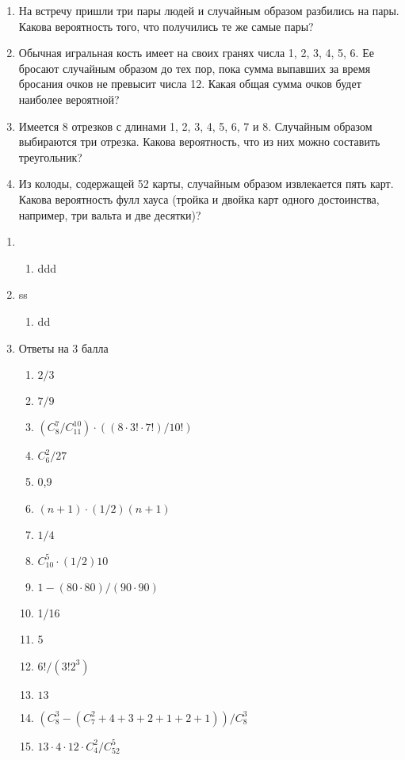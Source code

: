 \documentclass[12pt]{article} %
\begin{document}
\begin{enumerate}
\begin{enumerate}
  \item На встречу пришли три пары людей и случайным образом разбились на пары. Какова вероятность того, что получились те же самые пары?
  \newpage
\item Обычная игральная кость имеет на своих гранях числа 1, 2, 3, 4, 5, 6. Ее бросают случайным образом до тех пор, пока сумма выпавших за время бросания очков не превысит числа 12. Какая общая сумма очков будет наиболее вероятной?

	\item Имеется 8 отрезков с длинами 1, 2, 3, 4, 5, 6, 7 и 8. Случайным образом выбираются три отрезка. Какова вероятность, что из них можно составить треугольник?
	\item Из колоды, содержащей 52 карты, случайным образом извлекается пять карт. Какова вероятность фулл хауса (тройка и двойка карт одного достоинства, например, три вальта и две десятки)?

\end{enumerate}


\end{enumerate}

\begin{enumerate}
  \item
  \begin{enumerate}
    \item ddd
  \end{enumerate}
  \item ss
   \begin{enumerate}
     \item dd
   \end{enumerate}
  \item Ответы на 3 балла
  \begin{enumerate}
    \item $2/3$
    \item $7/9$
    \item $(C_8^7/C_{11}^{10})\cdot ((8\cdot 3!\cdot 7!)/10!)$
    \item $C_6^2/27$
    \item 0,9
    \item $(n+1)\cdot (1/2)(n+1)$
    \item $1/4$
    \item $C_{10}^5\cdot (1/2)10$
    \item $1-(80\cdot 80)/(90\cdot 90)$
    \item 1/16
    \item 5
    \item $6!/(3!2^3)$
    \item $13$
  \item $(C_8^3-(C_7^2+4+3+2+1+2+1))/ C_8^3$
  \item $13\cdot 4\cdot 12\cdot C_4^2/ C_{52}^5$

  \end{enumerate}

\end{enumerate}
\end{document}
